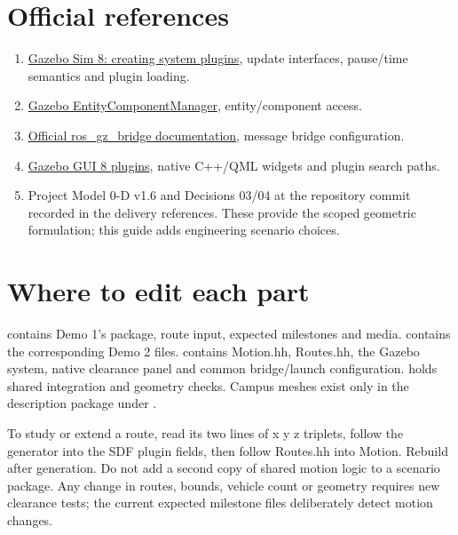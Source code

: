 \section*{Official references}
\begin{enumerate}
\item \href{https://gazebosim.org/api/sim/8/createsystemplugins.html}{Gazebo Sim 8: creating system plugins}, update interfaces, pause/time semantics and plugin loading.
\item \href{https://gazebosim.org/api/sim/8/classgz_1_1sim_1_1EntityComponentManager.html}{Gazebo EntityComponentManager}, entity/component access.
\item \href{https://docs.ros.org/en/jazzy/p/ros_gz_bridge/}{Official ros\_gz\_bridge documentation}, message bridge configuration.
\item \href{https://gazebosim.org/api/gui/8/plugins.html}{Gazebo GUI 8 plugins}, native C++/QML widgets and plugin search paths.
\item Project Model 0-D v1.6 and Decisions 03/04 at the repository commit recorded in the delivery references. These provide the scoped geometric formulation; this guide adds engineering scenario choices.
\end{enumerate}

\section{Where to edit each part}
 contains Demo 1's package, route input, expected milestones and media.  contains the corresponding Demo 2 files.  contains Motion.hh, Routes.hh, the Gazebo system, native clearance panel and common bridge/launch configuration.  holds shared integration and geometry checks. Campus meshes exist only in the description package under .

To study or extend a route, read its two lines of x y z triplets, follow the generator into the SDF plugin fields, then follow Routes.hh into Motion. Rebuild after generation. Do not add a second copy of shared motion logic to a scenario package. Any change in routes, bounds, vehicle count or geometry requires new clearance tests; the current expected milestone files deliberately detect motion changes.

